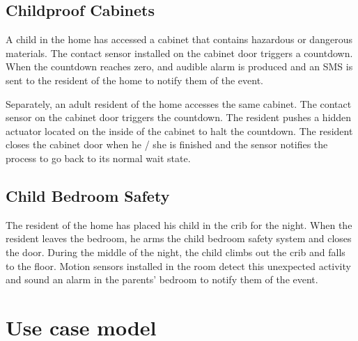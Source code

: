 \documentclass{report}
\begin{document}
\subsection*{Childproof Cabinets}

A child in the home has accessed a cabinet that contains hazardous or dangerous materials. The
contact sensor installed on the cabinet door triggers a countdown. When the countdown reaches
zero, and audible alarm is produced and an SMS is sent to the resident of the home to notify them
of the event.

Separately, an adult resident of the home accesses the same cabinet. The contact sensor on the
cabinet door triggers the countdown. The resident pushes a hidden actuator located on the
inside of the cabinet to halt the countdown. The resident closes the cabinet door when he / she is
finished and the sensor notifies the process to go back to its normal wait state.

\subsection*{Child Bedroom Safety}

The resident of the home has placed his child in the crib for the night. When the resident leaves
the bedroom, he arms the child bedroom safety system and closes the door. During the middle
of the night, the child climbs out the crib and falls to the floor. Motion sensors installed in the room
detect this unexpected activity and sound an alarm in the parents' bedroom to notify them of the
event.

\section{Use case model}
\end{document}
